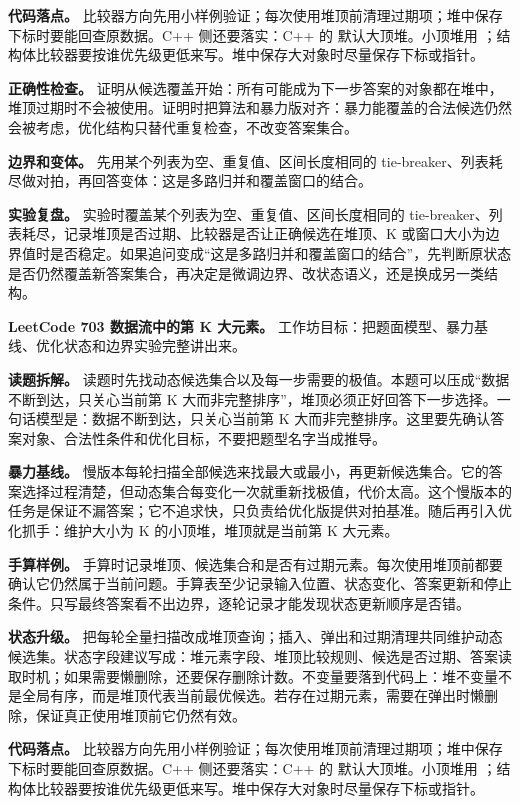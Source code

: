 \textbf{代码落点。} 比较器方向先用小样例验证；每次使用堆顶前清理过期项；堆中保存下标时要能回查原数据。C++ 侧还要落实：C++ 的  默认大顶堆。小顶堆用 ；结构体比较器要按谁优先级更低来写。堆中保存大对象时尽量保存下标或指针。

\textbf{正确性检查。} 证明从候选覆盖开始：所有可能成为下一步答案的对象都在堆中，堆顶过期时不会被使用。证明时把算法和暴力版对齐：暴力能覆盖的合法候选仍然会被考虑，优化结构只替代重复检查，不改变答案集合。

\textbf{边界和变体。} 先用某个列表为空、重复值、区间长度相同的 tie-breaker、列表耗尽做对拍，再回答变体：这是多路归并和覆盖窗口的结合。

\textbf{实验复盘。} 实验时覆盖某个列表为空、重复值、区间长度相同的 tie-breaker、列表耗尽，记录堆顶是否过期、比较器是否让正确候选在堆顶、K 或窗口大小为边界值时是否稳定。如果追问变成“这是多路归并和覆盖窗口的结合”，先判断原状态是否仍然覆盖新答案集合，再决定是微调边界、改状态语义，还是换成另一类结构。

\noindent\textbf{LeetCode 703 数据流中的第 K 大元素。} 工作坊目标：把题面模型、暴力基线、优化状态和边界实验完整讲出来。

\textbf{读题拆解。} 读题时先找动态候选集合以及每一步需要的极值。本题可以压成“数据不断到达，只关心当前第 K 大而非完整排序”，堆顶必须正好回答下一步选择。一句话模型是：数据不断到达，只关心当前第 K 大而非完整排序。这里要先确认答案对象、合法性条件和优化目标，不要把题型名字当成推导。

\textbf{暴力基线。} 慢版本每轮扫描全部候选来找最大或最小，再更新候选集合。它的答案选择过程清楚，但动态集合每变化一次就重新找极值，代价太高。这个慢版本的任务是保证不漏答案；它不追求快，只负责给优化版提供对拍基准。随后再引入优化抓手：维护大小为 K 的小顶堆，堆顶就是当前第 K 大元素。

\textbf{手算样例。} 手算时记录堆顶、候选集合和是否有过期元素。每次使用堆顶前都要确认它仍然属于当前问题。手算表至少记录输入位置、状态变化、答案更新和停止条件。只写最终答案看不出边界，逐轮记录才能发现状态更新顺序是否错。

\textbf{状态升级。} 把每轮全量扫描改成堆顶查询；插入、弹出和过期清理共同维护动态候选集。状态字段建议写成：堆元素字段、堆顶比较规则、候选是否过期、答案读取时机；如果需要懒删除，还要保存删除计数。不变量要落到代码上：堆不变量不是全局有序，而是堆顶代表当前最优候选。若存在过期元素，需要在弹出时懒删除，保证真正使用堆顶前它仍然有效。

\textbf{代码落点。} 比较器方向先用小样例验证；每次使用堆顶前清理过期项；堆中保存下标时要能回查原数据。C++ 侧还要落实：C++ 的  默认大顶堆。小顶堆用 ；结构体比较器要按谁优先级更低来写。堆中保存大对象时尽量保存下标或指针。

